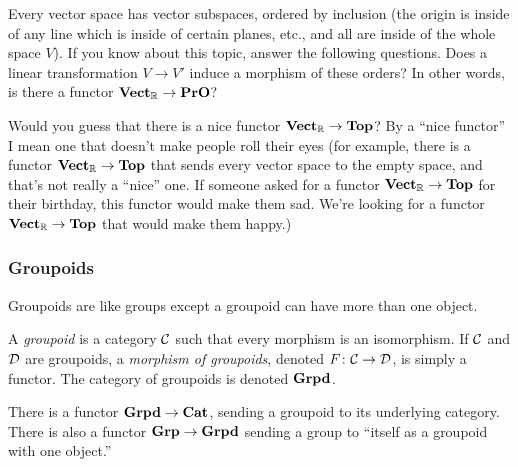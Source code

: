 \begin{exercise}
Every vector space has vector subspaces, ordered by inclusion (the origin is inside of any line which is inside of certain planes, etc., and all are inside of the whole space $V$). If you know about this topic, answer the following questions.
\sexc Does a linear transformation $V\to V'$ induce a morphism of these orders? In other words, is there a functor ${\bf Vect}_{\mathbb R}\rightarrow{\bf PrO}$?
\item Would you guess that there is a nice functor ${\bf Vect}_{\mathbb R}\rightarrow{\bf Top}$? By a “nice functor” I mean one that doesn't make people roll their eyes (for example, there is a functor ${\bf Vect}_{\mathbb R}\rightarrow{\bf Top}$ that sends every vector space to the empty space, and that's not really a “nice” one. If someone asked for a functor ${\bf Vect}_{\mathbb R}\rightarrow{\bf Top}$ for their birthday, this functor would make them sad. We're looking for a functor ${\bf Vect}_{\mathbb R}\rightarrow{\bf Top}$ that would make them happy.)
\endsexc
\end{exercise}



\subsubsection{Groupoids}\label{sec:groupoid}

Groupoids are like groups except a groupoid can have more than one object. 

\begin{definition}

A {\em groupoid} is a category $\mathcal{C}$ such that every morphism is an isomorphism. If $\mathcal{C}$ and $\mathcal{D}$ are groupoids, a {\em morphism of groupoids}, denoted $F\colon\mathcal{C}\rightarrow\mathcal{D}$, is simply a functor. The category of groupoids is denoted ${\bf Grpd}$.

\end{definition}

\begin{example}

There is a functor ${\bf Grpd}\rightarrow{\bf Cat}$, sending a groupoid to its underlying category. There is also a functor ${\bf Grp}\rightarrow{\bf Grpd}$ sending a group to “itself as a groupoid with one object.” 

\end{example}

